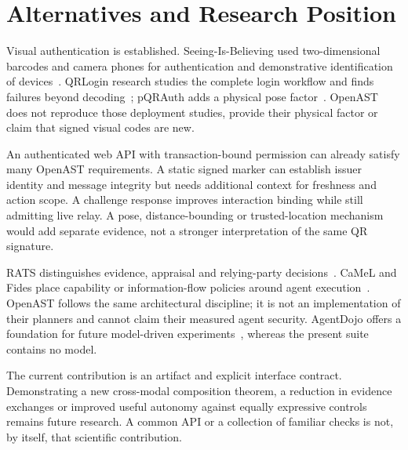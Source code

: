 \section{Alternatives and Research Position}
Visual authentication is established. Seeing-Is-Believing used two-dimensional
barcodes and camera phones for authentication and demonstrative identification
of devices~\cite{sib}. QRLogin research studies the complete login workflow and
finds failures beyond decoding~\cite{qrlogin}; pQRAuth adds a physical pose
factor~\cite{pqrauth}. OpenAST does not reproduce those deployment studies,
provide their physical factor or claim that signed visual codes are new.

An authenticated web API with transaction-bound permission can already satisfy
many OpenAST requirements. A static signed marker can establish issuer identity
and message integrity but needs additional context for freshness and action
scope. A challenge response improves interaction binding while still admitting
live relay. A pose, distance-bounding or trusted-location mechanism would add
separate evidence, not a stronger interpretation of the same QR signature.

RATS distinguishes evidence, appraisal and relying-party decisions~\cite{rats}.
CaMeL and Fides place capability or information-flow policies around agent
execution~\cite{camel,fides}. OpenAST follows the same architectural discipline;
it is not an implementation of their planners and cannot claim their measured
agent security. AgentDojo offers a foundation for future model-driven
experiments~\cite{agentdojo}, whereas the present suite contains no model.

The current contribution is an artifact and explicit interface contract.
Demonstrating a new cross-modal composition theorem, a reduction in evidence
exchanges or improved useful autonomy against equally expressive controls remains
future research. A common API or a collection of familiar checks is not, by
itself, that scientific contribution.

